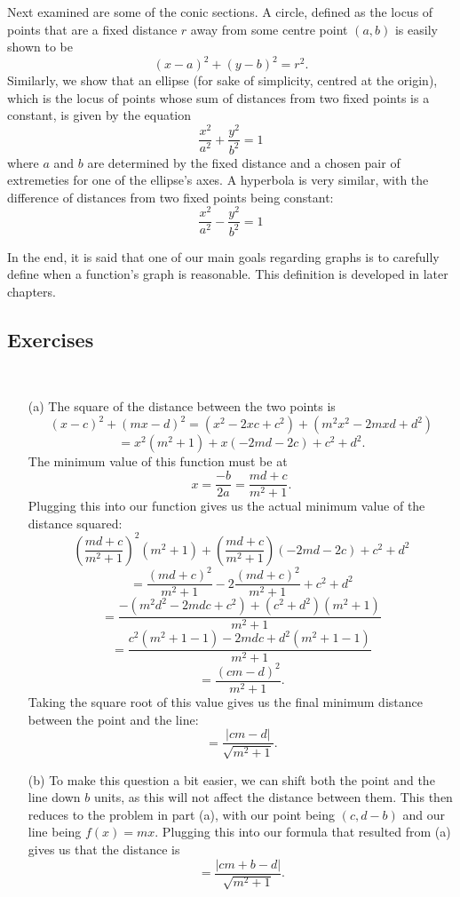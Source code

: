 Next examined are some of the conic sections. A circle, defined as the locus of points that are a fixed distance $r$ away from some centre point $(a, b)$ is easily shown to be
\[ (x - a)^2 + (y - b)^2 = r^2. \]
Similarly, we show that an ellipse (for sake of simplicity, centred at the origin), which is the locus of points whose sum of distances from two fixed points is a constant, is given by the equation
\[ \frac{x^2}{a^2} + \frac{y^2}{b^2} = 1 \]
where $a$ and $b$ are determined by the fixed distance and a chosen pair of extremeties for one of the ellipse's axes. A hyperbola is very similar, with the difference of distances from two fixed points being constant:
\[ \frac{x^2}{a^2} - \frac{y^2}{b^2} = 1 \]

In the end, it is said that one of our main goals regarding graphs is to carefully define when a function's graph is reasonable. This definition is developed in later chapters.

\subsection{Exercises}
\begin{problem}[4-22] \ 
\begin{enumerate}

\item[(a)]
The square of the distance between the two points is
\[ (x - c)^2 + (mx - d)^2 = (x^2 - 2xc + c^2) + (m^2x^2 - 2mxd + d^2) \]
\[ = x^2(m^2 + 1) + x(-2md - 2c) + c^2 + d^2. \]
The minimum value of this function must be at 
\[ x = \frac{-b}{2a} = \frac{md + c}{m^2 + 1}. \]
Plugging this into our function gives us the actual minimum value of the distance squared:
\[ \left(\frac{md + c}{m^2 + 1}\right)^2(m^2 + 1) + \left(\frac{md + c}{m^2 + 1}\right)(-2md - 2c) + c^2 + d^2 \]
\[ = \frac{(md + c)^2}{m^2 + 1} -2\frac{(md + c)^2}{m^2 + 1} + c^2 + d^2 \]
\[ = \frac{-(m^2d^2 -2mdc + c^2) + (c^2 + d^2)(m^2 + 1)}{m^2 + 1} \]
\[ = \frac{c^2(m^2 + 1 - 1) - 2mdc + d^2(m^2 + 1 - 1)}{m^2 + 1}\]
\[ = \frac{(cm - d)^2}{m^2 + 1}. \]
Taking the square root of this value gives us the final minimum distance between the point and the line:
\[ = \frac{|cm - d|}{\sqrt{m^2 + 1}}. \]

\item[(b)]
To make this question a bit easier, we can shift both the point and the line down $b$ units, as this will not affect the distance between them. This then reduces to the problem in part (a), with our point being $(c, d - b)$ and our line being $f(x) = mx$. Plugging this into our formula that resulted from (a) gives us that the distance is
\[ = \frac{|cm + b - d|}{\sqrt{m^2 + 1}}. \]

\end{enumerate}
\end{problem}

